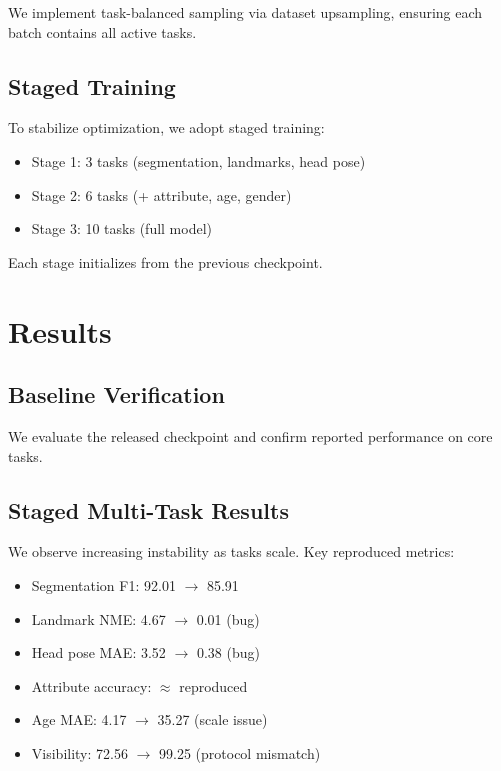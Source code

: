 We implement task-balanced sampling via dataset upsampling, ensuring each batch contains all active tasks.

\subsection{Staged Training}

To stabilize optimization, we adopt staged training:

\begin{itemize}
\item Stage 1: 3 tasks (segmentation, landmarks, head pose)
\item Stage 2: 6 tasks (+ attribute, age, gender)
\item Stage 3: 10 tasks (full model)
\end{itemize}

Each stage initializes from the previous checkpoint.

\section{Results}

\subsection{Baseline Verification}

We evaluate the released checkpoint and confirm reported performance on core tasks.

\subsection{Staged Multi-Task Results}

We observe increasing instability as tasks scale. Key reproduced metrics:

\begin{itemize}
\item Segmentation F1: 92.01 $\rightarrow$ 85.91
\item Landmark NME: 4.67 $\rightarrow$ 0.01 (bug)
\item Head pose MAE: 3.52 $\rightarrow$ 0.38 (bug)
\item Attribute accuracy: $\approx$ reproduced
\item Age MAE: 4.17 $\rightarrow$ 35.27 (scale issue)
\item Visibility: 72.56 $\rightarrow$ 99.25 (protocol mismatch)
\end{itemize}

